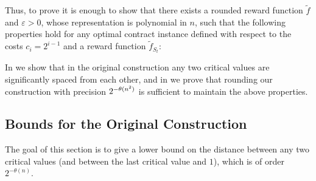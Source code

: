 \documentclass[11pt]{article}
\newcommand{\eps}{\varepsilon}
\newcommand{\tf}{\tilde{f}}
\begin{document}
Thus, to prove  it is enough to show that there exists a rounded reward function $\tf$ and  $\eps > 0$, whose representation is polynomial in $n$, such that the following properties hold for any optimal contract instance defined with respect to the costs $c_i = 2^{i-1}$ and a reward function $\tf_{S_t}$:

In  we show that in the original construction any two critical values are significantly spaced from each other, and in  we prove that rounding our construction with precision $2^{-\theta(n^2)}$ is sufficient to maintain the above properties.

\subsection{Bounds for the Original Construction}\label{subApx:Bounds}
The goal of this section is to give a lower bound on the distance between any two critical values (and between the last critical value and $1$), which is of order $2^{-\theta (n)}$.
\end{document}
